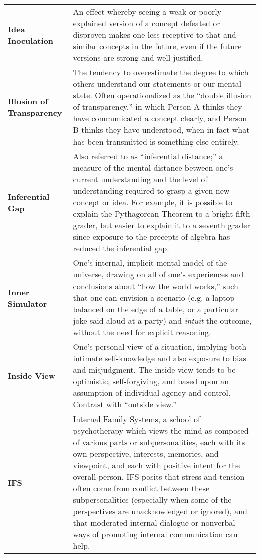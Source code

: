 \begin{longtable} { p{} p{} }
\textbf{Idea Inoculation} & An effect whereby seeing a weak or poorly-explained version of a concept defeated or disproven makes one less receptive to that and similar concepts in the future, even if the future versions are strong and well-justified.\\

\textbf{Illusion of Transparency} & The tendency to overestimate the degree to which others understand our statements or our mental state.  Often operationalized as the ``double illusion of transparency,'' in which Person A thinks they have communicated a concept clearly, and Person B thinks they have understood, when in fact what has been transmitted is something else entirely.\\

\textbf{Inferential Gap} & Also referred to as ``inferential distance;'' a measure of the mental distance between one's current understanding and the level of understanding required to grasp a given new concept or idea.  For example, it is possible to explain the Pythagorean Theorem to a bright fifth grader, but easier to explain it to a seventh grader since exposure to the precepts of algebra has reduced the inferential gap.\\

\textbf{Inner Simulator} & One's internal, implicit mental model of the universe, drawing on all of one's experiences and conclusions about ``how the world works,'' such that one can envision a scenario (e.g. a laptop balanced on the edge of a table, or a particular joke said aloud at a party) and \emph{intuit} the outcome, without the need for explicit reasoning.\\

\textbf{Inside View} & One's personal view of a situation, implying both intimate self-knowledge and also exposure to bias and misjudgment.  The inside view tends to be optimistic, self-forgiving, and based upon an assumption of individual agency and control.  Contrast with ``outside view.''\\

\textbf{IFS} & Internal Family Systems, a school of psychotherapy which views the mind as composed of various parts or subpersonalities, each with its own perspective, interests, memories, and viewpoint, and each with positive intent for the overall person.  IFS posits that stress and tension often come from conflict between these subpersonalities (especially when some of the perspectives are unacknowledged or ignored), and that moderated internal dialogue or nonverbal ways of promoting internal communication can help.\\


\end{longtable}
